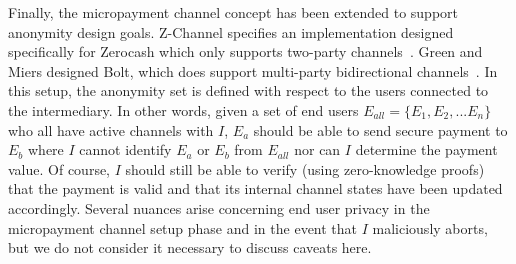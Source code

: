 Finally, the micropayment channel concept has been extended to support anonymity
design goals. Z-Channel specifies an implementation designed specifically for
Zerocash which only supports two-party channels~\cite{zhang2017z}. Green and
Miers designed Bolt, which does support multi-party bidirectional
channels~\cite{green2017bolt}. In this setup, the anonymity set is defined with
respect to the users connected to the intermediary. In other words, given a set
of end users $E_{all} = \{E_1, E_2, ... E_n\}$ who all have active channels with
$I$, $E_a$ should be able to send secure payment to $E_b$ where $I$ cannot
identify $E_a$ or $E_b$ from $E_{all}$ nor can $I$ determine the payment
value. Of course, $I$ should still be able to verify (using zero-knowledge
proofs) that the payment is valid and that its internal channel states have been
updated accordingly. Several nuances arise concerning end user privacy in the
micropayment channel setup phase and in the event that $I$ maliciously aborts,
but we do not consider it necessary to discuss caveats here.